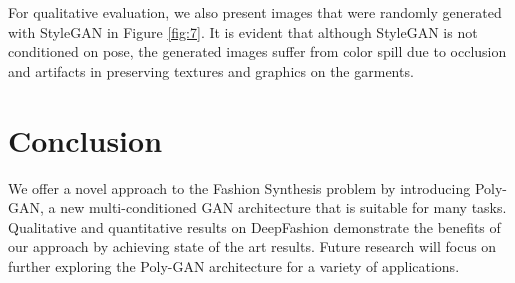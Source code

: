 \documentclass[11pt]{article}
\begin{document}
For qualitative evaluation, we also present images that were randomly generated with StyleGAN in Figure \ref{fig:7}. 
It is evident that although StyleGAN is not conditioned on pose, the generated images suffer from color spill due to occlusion and artifacts in preserving textures and graphics on the garments.





\section{Conclusion}
We offer a novel approach to the Fashion Synthesis problem by introducing Poly-GAN, a new multi-conditioned GAN architecture that is suitable for many tasks. Qualitative and quantitative results on DeepFashion demonstrate the benefits of our approach by achieving state of the art results. Future research will focus on further exploring the Poly-GAN architecture for a variety of applications.
\end{document}
